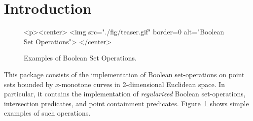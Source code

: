 \lcTex{%
  \newlength{\widthExtra}\setlength{\widthExtra}{1.1cm}
  \newlength{\widthLineReal}\setlength{\widthLineReal}{\linewidth}
  \addtolength{\widthLineReal}{-\widthExtra}
  \newlength{\minipageSpace}\setlength{\minipageSpace}{0.2cm}

  \newlength{\widthLeft}
  \newlength{\widthRight}
}

\newcommand{\reals}{{\rm I\!\hspace{-0.025em} R}}
\newcommand{\calC}{{\cal C}}
\newcommand{\calA}{{\cal A}}
\newcommand{\eps}{{\varepsilon}}
\newcommand{\dcel}{{\sc Dcel}}
\newcommand{\naive}{na\"{\i}ve}
\newcommand{\kdtree}{{\sc Kd}-tree}

\section{Introduction}
\label{bobs_sec:intro}
%
\begin{figure}[!htp]
\begin{ccTexOnly}

\end{ccTexOnly}
\begin{ccHtmlOnly}
  <p><center>
    <img src="./fig/teaser.gif" border=0 alt="Boolean Set Operations">
  </center>
\end{ccHtmlOnly}
\caption{Examples of Boolean Set Operations.} 
\label{fig:teaser}
\end{figure}

This package consists of the implementation of Boolean set-operations
on point sets bounded by $x$-monotone curves in 2-dimensional
Euclidean space. In particular, it contains the implementation of
{\em regularized} Boolean set-operations, intersection predicates, and
point containment predicates. Figure~\ref{fig:teaser} shows simple examples 
of such operations.

